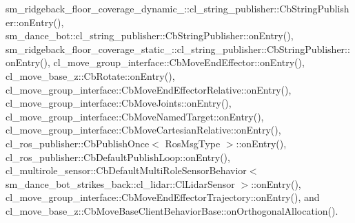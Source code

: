 sm\+\_\+ridgeback\+\_\+floor\+\_\+coverage\+\_\+dynamic\+\_\+::cl\+\_\+string\+\_\+publisher\+::\+Cb\+String\+Publisher\+::on\+Entry(), sm\+\_\+dance\+\_\+bot\+::cl\+\_\+string\+\_\+publisher\+::\+Cb\+String\+Publisher\+::on\+Entry(), sm\+\_\+ridgeback\+\_\+floor\+\_\+coverage\+\_\+static\+\_\+::cl\+\_\+string\+\_\+publisher\+::\+Cb\+String\+Publisher\+::on\+Entry(), cl\+\_\+move\+\_\+group\+\_\+interface\+::\+Cb\+Move\+End\+Effector\+::on\+Entry(), cl\+\_\+move\+\_\+base\+\_\+z\+::\+Cb\+Rotate\+::on\+Entry(), cl\+\_\+move\+\_\+group\+\_\+interface\+::\+Cb\+Move\+End\+Effector\+Relative\+::on\+Entry(), cl\+\_\+move\+\_\+group\+\_\+interface\+::\+Cb\+Move\+Joints\+::on\+Entry(), cl\+\_\+move\+\_\+group\+\_\+interface\+::\+Cb\+Move\+Named\+Target\+::on\+Entry(), cl\+\_\+move\+\_\+group\+\_\+interface\+::\+Cb\+Move\+Cartesian\+Relative\+::on\+Entry(), cl\+\_\+ros\+\_\+publisher\+::\+Cb\+Publish\+Once$<$ Ros\+Msg\+Type $>$\+::on\+Entry(), cl\+\_\+ros\+\_\+publisher\+::\+Cb\+Default\+Publish\+Loop\+::on\+Entry(), cl\+\_\+multirole\+\_\+sensor\+::\+Cb\+Default\+Multi\+Role\+Sensor\+Behavior$<$ sm\+\_\+dance\+\_\+bot\+\_\+strikes\+\_\+back\+::cl\+\_\+lidar\+::\+Cl\+Lidar\+Sensor $>$\+::on\+Entry(), cl\+\_\+move\+\_\+group\+\_\+interface\+::\+Cb\+Move\+End\+Effector\+Trajectory\+::on\+Entry(), and cl\+\_\+move\+\_\+base\+\_\+z\+::\+Cb\+Move\+Base\+Client\+Behavior\+Base\+::on\+Orthogonal\+Allocation().


